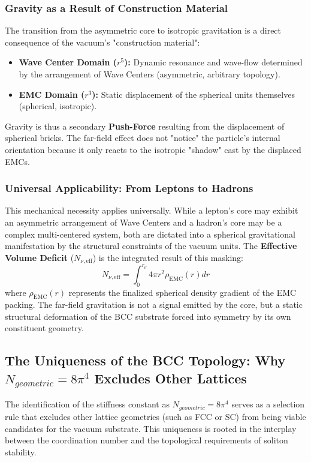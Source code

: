 \documentclass[10pt,a4paper]{article}
\begin{document}
\subsubsection{Gravity as a Result of Construction Material}
The transition from the asymmetric core to isotropic gravitation is a direct consequence of the vacuum's "construction material":
\begin{itemize}
	\item \textbf{Wave Center Domain ($r^5$):} Dynamic resonance and wave-flow determined by the arrangement of Wave Centers (asymmetric, arbitrary topology).
	\item \textbf{EMC Domain ($r^3$):} Static displacement of the spherical units themselves (spherical, isotropic).
\end{itemize}
Gravity is thus a secondary \textbf{Push-Force} resulting from the displacement of spherical bricks. The far-field effect does not "notice" the particle's internal orientation because it only reacts to the isotropic "shadow" cast by the displaced EMCs. 

\subsubsection{Universal Applicability: From Leptons to Hadrons}
This mechanical necessity applies universally. While a lepton's core may exhibit an asymmetric arrangement of Wave Centers and a hadron's core may be a complex multi-centered system, both are dictated into a spherical gravitational manifestation by the structural constraints of the vacuum units. The \textbf{Effective Volume Deficit} ($N_{\nu, \text{eff}}$) is the integrated result of this masking:
\begin{equation}
	N_{\nu, \text{eff}} = \int_0^{r_{\nu}} 4\pi r^2 \rho_{\text{EMC}}(r) dr
\end{equation}
where $\rho_{\text{EMC}}(r)$ represents the finalized spherical density gradient of the EMC packing. The far-field gravitation is not a signal emitted by the core, but a static structural deformation of the BCC substrate forced into symmetry by its own constituent geometry.

\subsection{The Uniqueness of the BCC Topology: Why $N_{geometric} = 8\pi^4$ Excludes Other Lattices}

The identification of the stiffness constant as $N_{geometric} = 8\pi^4$ serves as a selection rule that excludes other lattice geometries (such as FCC or SC) from being viable candidates for the vacuum substrate. This uniqueness is rooted in the interplay between the coordination number and the topological requirements of soliton stability.
\end{document}
